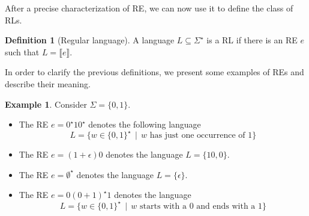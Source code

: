 \documentclass[oneside,12pt]{scrbook}
\theoremstyle{definition}
\newtheorem{Example}{Example}
\newcommand{\sembrackets}[1]{\ensuremath{\llbracket #1 \rrbracket}}
\theoremstyle{plain}
\theoremstyle{definition}
\newtheorem{Definition}{Definition}
\begin{document}
After a precise characterization of RE, we can now use it to define the class of RLs.

\begin{Definition}[Regular language]
  A language $L \subseteq \Sigma^\star$ is a RL if there is an RE 
  $e$ such that $L = \sembrackets{e}$.
\end{Definition}

In order to clarify the previous definitions, we present some examples of REs and describe their meaning.

\begin{Example}
  Consider $\Sigma =\{0,1\}$.
  \begin{itemize}
    \item The RE $e = 0^\star 10^\star$ denotes the following language
      \begin{equation*}L =\{w \in\{0,1\}^\star\,\mid\,w \text{ has just one occurrence of }1\}\end{equation*}
    \item The RE $e =(1 + \epsilon)0$ denotes the language $L = \{10, 0\}$.
    \item The RE $e = \emptyset^\star$ denotes the language $L = \{\epsilon\}$.
    \item The RE $e = 0(0 + 1)^\star 1$ denotes the language
      \begin{equation*}L =\{w \in\{0,1\}^\star\,\mid\,w \text{ starts with a 0 and ends with a 1}\}\end{equation*}
  \end{itemize}
\end{Example}
\end{document}
